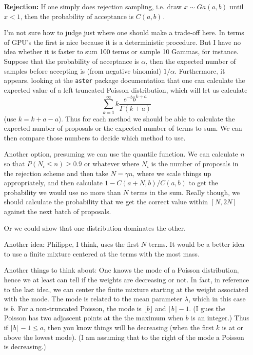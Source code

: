 \documentclass{article}
\newcommand{\floor}[1]{\lfloor #1 \rfloor}
\newcommand{\ceil}[1]{\lceil #1 \rceil}
\begin{document}
\textbf{Rejection:} If one simply does rejection sampling, i.e. draw $x \sim
Ga(a,b)$ until $x < 1$, then the probability of acceptance is $C(a,b)$.

I'm not sure how to judge just where one should make a trade-off here.  In terms
of GPU's the first is nice because it is a deterministic procedure.  But I have
no idea whether it is faster to sum 100 terms or sample 10 Gammas, for instance.
Suppose that the probability of acceptance is $\alpha$, then the expected number
of samples before accepting is (from negative binomial) $1/\alpha$.
Furthermore, it appears, looking at the \texttt{aster} package documentation
that one can calculate the expected value of a left truncated Poisson
distribution, which will let us calculate
\[
\sum_{k=1}^\infty k \frac{e^{-b} b^{k+a}}{\Gamma(k+a)}
\]
(use $k = k + a - a$).  Thus for each method we should be able to calculate the
expected number of proposals or the expected number of terms to sum.  We can
then compare those numbers to decide which method to use.

Another option, presuming we can use the quantile function.  We can calculate
$n$ so that $P(N_i \leq n) \geq 0.9$ or whatever where $N_i$ is the number of
proposals in the rejection scheme and then take $N = \gamma n$, where we scale
things up appropriately, and then calculate $1 - C(a+N,b) / C(a,b)$ to get the
probability we would use no more than $N$ terms in the sum.  Really though, we
should calculate the probability that we get the correct value within $[N, 2N]$
against the next batch of proposals.

Or we could show that one distribution dominates the other.

Another idea: Philippe, I think, uses the first $N$ terms.  It would be a better
idea to use a finite mixture centered at the terms with the most mass.

Another things to think about: One knows the mode of a Poisson distribution,
hence we at least can tell if the weights are decreasing or not.  In fact, in
reference to the last idea, we can center the finite mixture starting at the
weight associated with the mode.  The mode is related to the mean parameter
$\lambda$, which in this case is $b$.  For a non-truncated Poisson, the mode is
$\floor{b}$ and $\ceil{b}-1$.  (I gues the Poisson has two adjascent points at
the the maximum when $b$ is an integer.)  Thus if $\ceil{b}-1 \leq a$, then you
know things will be decreasing (when the first $k$ is at or above the lowest
mode).  (I am assuming that to the right of the mode a Poisson is decreasing.)
\end{document}
